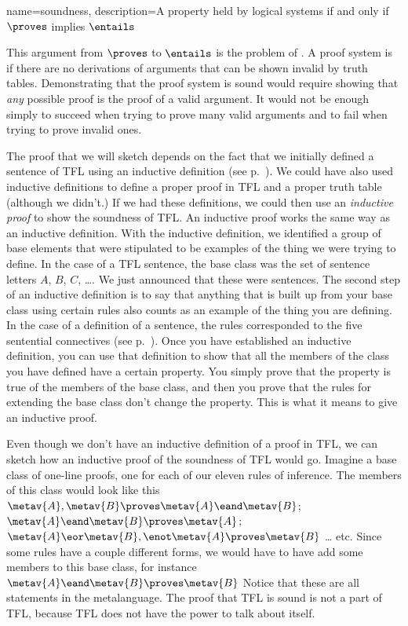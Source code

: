{
name=soundness,
description={A property held by logical systems if and only if $\proves $ implies $\entails $}
}

This argument from $\proves $ to $\entails $ is the problem of . \label{def:soundness} A proof system is  if there are no derivations of arguments that can be shown invalid by truth tables. \label{def_Soundness} Demonstrating that the proof system is sound would require showing that \emph{any} possible proof is the proof of a valid argument. It would not be enough simply to succeed when trying to prove many valid arguments and to fail when trying to prove invalid ones.

The proof that we will sketch depends on the fact that we initially
defined a sentence of TFL using an inductive definition (see
p.~\pageref{TFLsentences}). We could have also used inductive
definitions to define a proper proof in TFL and a proper truth table
(although we didn't.) If we had these definitions, we could then use an
\emph{inductive proof} to show the soundness of TFL. An inductive
proof works the same way as an inductive definition. With the
inductive definition, we identified a group of base elements that were
stipulated to be examples of the thing we were trying to define. In
the case of a TFL sentence, the base class was the set of sentence
letters $A$, $B$, $C$, \dots. We just announced that these were
sentences. The second step of an inductive definition is to say that
anything that is built up from your base class using certain rules
also counts as an example of the thing you are defining. In the case
of a definition of a sentence, the rules corresponded to the five
sentential connectives (see p.~\pageref{TFLsentences}). Once you have
established an inductive definition, you can use that definition to
show that all the members of the class you have defined have a certain
property. You simply prove that the property is true of the members of
the base class, and then you prove that the rules for extending the
base class don't change the property. This is what it means to give an
inductive proof.

Even though we don't have an inductive definition of a proof in TFL, we can sketch how an inductive proof of the soundness of TFL would go. Imagine a base class of one-line proofs, one for each of our eleven rules of inference. The members of this class would look like this $\metav{A}, \metav{B} \proves  \metav{A} \eand \metav{B}$; $\metav{A} \eand \metav{B} \proves \metav{A}$; $\metav{A} \eor \metav{B}, \enot\metav{A} \proves  \metav{B}$ \ldots{} etc. Since some rules have a couple different forms, we would have to have add some members to this base class, for instance $\metav{A} \eand \metav{B} \proves  \metav{B}$ Notice that these are all statements in the metalanguage. The proof that TFL is sound is not a part of TFL, because TFL does not have the power to talk about itself.

